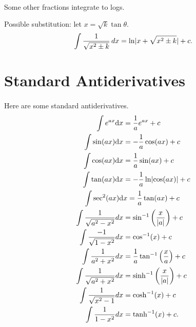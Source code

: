 \documentclass[../multivariate_calculus.tex]{subfiles}
\begin{document}
        \paragraph{}
        Some other fractions integrate to logs.
        \begin{example}
            Possible substitution: let $x=\sqrt{k}\tan\theta$.
            \begin{equation*}
                \int\frac{1}{\sqrt{x^2\pm k}}\,dx = \ln\lvert x+\sqrt{x^2\pm k}\rvert+c.
            \end{equation*}
        \end{example}


    \section{Standard Antiderivatives}
        \paragraph{}
        Here are some standard antiderivatives.
        \begin{align}
            \int e^{ax}\mathrm{d}x&=\frac{1}{a}e^{ax}+c\\
            \int\sin(ax)\mathrm{d}x&=-\frac{1}{a}\cos(ax)+c\\
            \int\cos(ax)\mathrm{d}x&=\frac{1}{a}\sin(ax)+c\\
            \int\tan(ax)\mathrm{d}x&=-\frac{1}{a}\ln\lvert\cos(ax)\rvert+c\\
            \int\sec^2(ax)\mathrm{d}&x=\frac{1}{a}\tan(ax)+c\\
            \int\frac{1}{\sqrt{a^2-x^2}}dx&=\sin^{-1}\left(\frac{x}{\lvert a\rvert}\right)+c \\
            \int\frac{-1}{\sqrt{1-x^2}}dx&=\cos^{-1}(x)+c \\
            \int\frac{1}{a^2+x^2}dx&=\frac{1}{a}\tan^{-1}\left(\frac{x}{a}\right)+c \\
            \int\frac{1}{\sqrt{a^2+x^2}}dx&=\sinh^{-1}\left(\frac{x}{\lvert a\rvert}\right)+c \\
            \int\frac{1}{\sqrt{x^2-1}}dx&=\cosh^{-1}(x)+c \\
            \int\frac{1}{1-x^2}dx&=\tanh^{-1}(x)+c.
        \end{align}
\end{document}

